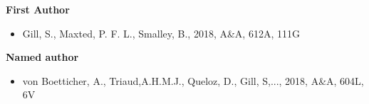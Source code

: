 
\begin{center}
{\Large \bf  First Author}
\end{center}

\begin{itemize}
\item Gill, S., Maxted, P. F. L., Smalley, B., 2018, A\&A, 612A, 111G
\end{itemize}

\begin{center}
{\Large \bf Named author}
\end{center}

\begin{itemize}
\item von Boetticher, A., Triaud,A.H.M.J., Queloz, D.,  Gill, S,..., 2018, A\&A, 604L, 6V 
\end{itemize}

